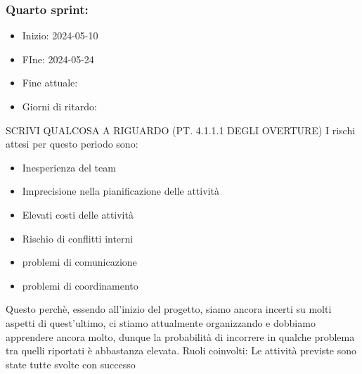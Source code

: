     \subsubsection{Quarto sprint:}
    \begin{itemize}
        \item Inizio: 2024-05-10
        \item FIne: 2024-05-24
        \item Fine attuale:
        \item Giorni di ritardo:
    \end{itemize}
    SCRIVI QUALCOSA A RIGUARDO (PT. 4.1.1.1 DEGLI OVERTURE)
    I rischi attesi per questo periodo sono:
    \begin{itemize}
        \item Inesperienza del team
        \item Imprecisione nella pianificazione delle attività
        \item Elevati costi delle attività
        \item Rischio di conflitti interni 
        \item problemi di comunicazione
        \item problemi di coordinamento
    \end{itemize}
    Questo perchè, essendo all’inizio del progetto, siamo ancora incerti su molti aspetti di quest’ultimo, ci stiamo attualmente organizzando e dobbiamo apprendere ancora molto, dunque la probabilità di incorrere in qualche problema tra quelli riportati è abbastanza elevata.
    Ruoli coinvolti: 
    Le attività previste sono state tutte svolte con successo

